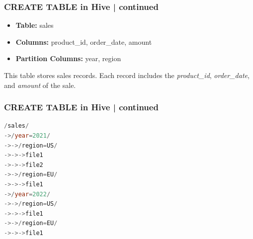 	\begin{frame}[fragile]
	\frametitle{CREATE TABLE in Hive | continued}
	\begin{tcolorbox}[colback=white,colframe=black,title= Part 5: Table Partitions]
		\small

	\begin{itemize}
	\item \textbf{Table:} sales
	\item \textbf{Columns:} product_id, order_date, amount
	\item \textbf{Partition Columns:} year, region
	\end{itemize}
	This table stores sales records. Each record includes the \textit{product\_id}, \textit{order\_date}, and \textit{amount} of the sale.
\end{tcolorbox}
	
\end{frame}
\begin{frame}[fragile]
\frametitle{CREATE TABLE in Hive | continued}
\vspace{-0.5cm}\begin{tcolorbox}[colback=white,colframe=black,title= Part 5: Table Partitions]
\small
\vspace{-0.3cm}\begin{lstlisting}[caption={Each partition by \textit{year} and \textit{region} is represented as a sub-directory under the main \textit{sales} directory.},language=SQL,showstringspaces=false,showspaces=false,xleftmargin=4.0ex]
/sales/
->/year=2021/
->->/region=US/
->->->file1
->->->file2
->->/region=EU/
->->->file1
->/year=2022/
->->/region=US/
->->->file1
->->/region=EU/
->->->file1
\end{lstlisting}
	
\end{tcolorbox}
	
\end{frame}
